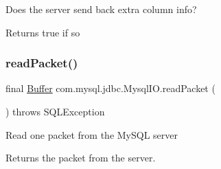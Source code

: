 Does the server send back extra column info?

\begin{DoxyReturn}{Returns}
true if so 
\end{DoxyReturn}
\mbox{\label{classcom_1_1mysql_1_1jdbc_1_1_mysql_i_o_a97388b336bdd49fcbf3ee8f1e305e11a}} 
\subsubsection{\texorpdfstring{read\+Packet()}{readPacket()}}
{\footnotesize\ttfamily final \mbox{\hyperlink{classcom_1_1mysql_1_1jdbc_1_1_buffer}{Buffer}} com.\+mysql.\+jdbc.\+Mysql\+I\+O.\+read\+Packet (\begin{DoxyParamCaption}{ }\end{DoxyParamCaption}) throws S\+Q\+L\+Exception\hspace{0.3cm}{\ttfamily [protected]}}

Read one packet from the My\+S\+QL server

\begin{DoxyReturn}{Returns}
the packet from the server.
\end{DoxyReturn}

